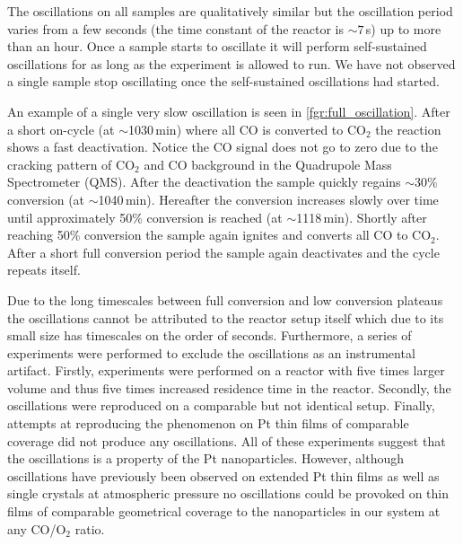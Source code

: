 \documentclass[journal=jacsat,manuscript=article]{achemso}
\begin{document}
The oscillations on all samples are qualitatively similar but the oscillation
period varies from a few seconds (the time constant of the reactor is
$\sim7\,$s) up to more than an hour. Once a sample starts to oscillate it will
perform self-sustained oscillations for as long as the experiment is allowed to
run. We have not observed a single sample stop oscillating once the self-sustained oscillations had started.

An example of a single very slow oscillation is seen in
\ref{fgr:full_oscillation}. After a short on-cycle (at $\sim$1030\,min) where
all CO is converted to CO$_2$ the reaction shows a fast deactivation. 
Notice the CO signal does not go to zero due to the cracking pattern of
CO$_2$ and CO background in the Quadrupole Mass Spectrometer (QMS).
After the deactivation the sample quickly regains
$\sim$30\% conversion (at $\sim$1040\,min). Hereafter the conversion increases
slowly over time until approximately 50\% conversion is reached (at
$\sim$1118\,min). Shortly after reaching 50\% conversion the sample again
ignites and converts all CO to CO$_2$. After a short full conversion period the
sample again deactivates and the cycle repeats itself.

Due to the long timescales between full conversion and low conversion plateaus
the oscillations cannot be attributed to the reactor setup itself which due to
its small size has timescales on the order of seconds. Furthermore, a series of
experiments were performed to exclude the oscillations as an instrumental
artifact. Firstly, experiments were performed on a reactor with five times larger volume and thus
five times increased residence time in the reactor. Secondly, the oscillations were
reproduced on a comparable but not identical setup. Finally, attempts at
reproducing the phenomenon on Pt thin films of comparable coverage did not
produce any oscillations. All of these experiments suggest that the
oscillations is a property of the Pt nanoparticles. However, 
although oscillations have previously been observed on extended Pt thin films
\cite{Singh2010} as well as single crystals\cite{Hendriksen2005} at atmospheric
pressure no oscillations could be provoked on thin films of comparable
geometrical coverage to the nanoparticles in our system at any CO/O$_2$ ratio.
\end{document}
